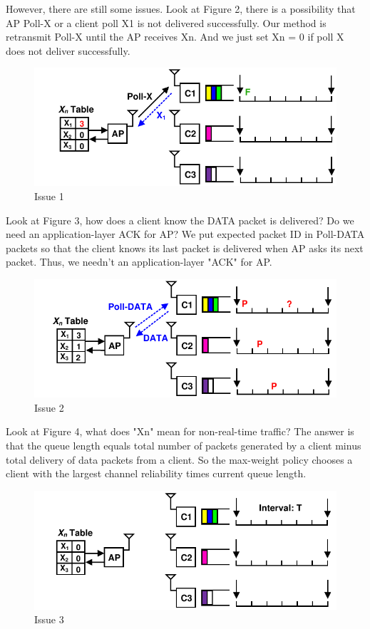 \documentclass{article}
\begin{document}
However, there are still some issues. Look at Figure 2, there is a possibility that AP Poll-X or a client poll X1 is not delivered successfully. Our method is retransmit Poll-X until the AP receives Xn. And we just set Xn = 0 if poll X does not deliver successfully. 

\begin{figure}[H]
\centering
\includegraphics[scale=0.8]{discussion_1.pdf}
\caption{Issue 1}
\end{figure}

Look at Figure 3, how does a client know the DATA packet is delivered? Do we need an application-layer ACK for AP?  We put expected packet ID in Poll-DATA packets so that the client knows its last packet is delivered when AP asks its next packet. Thus, we needn't an application-layer "ACK" for AP. 

\begin{figure}[H]
\centering
\includegraphics[scale=0.8]{discussion_2.pdf}
\caption{Issue 2}
\end{figure}

Look at Figure 4, what does "Xn" mean for non-real-time traffic? The answer is that the queue length equals total number of packets generated by a client minus total delivery of data packets from a client. So the max-weight policy chooses a client with the largest channel reliability times current queue length. 

\begin{figure}[H]
\centering
\includegraphics[scale=0.8]{discussion_3.pdf}
\caption{Issue 3}
\end{figure}
\end{document}
